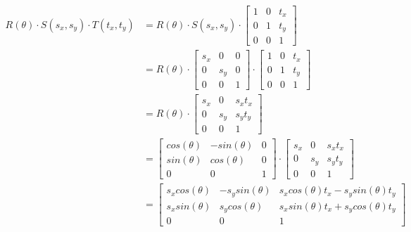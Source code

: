 \documentclass{article} %
\begin{document}
\begin{align*}
R(\theta) \cdot S(s_x, s_y) \cdot T(t_x, t_y) &=
R(\theta) \cdot S(s_x, s_y) \cdot
\left[
\begin{matrix}
1 & 0 & t_x\\
0 & 1 & t_y\\
0 & 0 & 1
\end{matrix}
\right]\\
&=
R(\theta) \cdot
\left[
\begin{matrix}
s_x & 0 & 0\\
0 & s_y & 0\\
0 & 0 & 1
\end{matrix}
\right]
\cdot
\left[
\begin{matrix}
1 & 0 & t_x\\
0 & 1 & t_y\\
0 & 0 & 1
\end{matrix}
\right]\\
&=
R(\theta) \cdot
\left[
\begin{matrix}
s_x & 0 & s_x t_x\\
0 & s_y & s_y t_y\\
0 & 0 & 1
\end{matrix}
\right]\\
&= \left[
\begin{matrix}
cos(\theta) & -sin(\theta) & 0\\
sin(\theta) & cos(\theta) & 0\\
0 & 0 & 1
\end{matrix}
\right]
\cdot
\left[
\begin{matrix}
s_x & 0 & s_x t_x\\
0 & s_y & s_y t_y\\
0 & 0 & 1
\end{matrix}
\right]\\
&= \left[
\begin{matrix}
s_x cos(\theta) & - s_y sin(\theta) & s_x cos(\theta) t_x - s_y sin(\theta) t_y\\
s_x sin(\theta) & s_y cos(\theta) & s_x sin(\theta) t_x + s_y cos(\theta) t_y\\
0 & 0 & 1
\end{matrix}
\right]
\end{align*}
\end{document}
